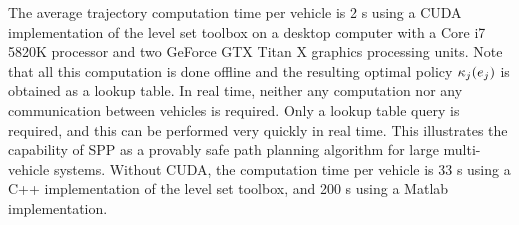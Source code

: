The average trajectory computation time per vehicle is 2 s using a CUDA implementation of the level set toolbox on a desktop computer with a Core i7 5820K processor and two GeForce GTX Titan X graphics processing units. Note that all this computation is done offline and the resulting optimal policy $\kappa_j(e_j)$ is obtained as a lookup table. In real time, neither any computation nor any communication between vehicles is required. Only a lookup table query is required, and this can be performed very quickly in real time. This illustrates the capability of SPP as a provably safe path planning algorithm for large multi-vehicle systems. Without CUDA, the computation time per vehicle is 33 s using a C++ implementation of the level set toolbox, and 200 s using a Matlab implementation.